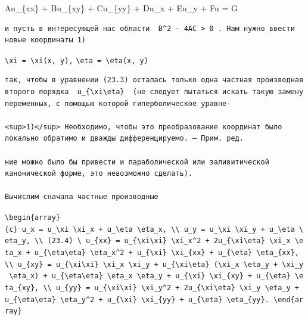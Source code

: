 \documentclass[
  ukrainian,
]{article}
\begin{document}
Au\_\{xx\} + Bu\_\{xy\} + Cu\_\{yy\} + Du\_x + Eu\_y + Fu = G

\begin{verbatim}
и пусть в интересующей нас области  B^2 - 4AC > 0 . Нам нужно ввести новые координаты 1)
\end{verbatim}

\texttt{\textbackslash{}xi\ =\ \textbackslash{}xi(x,\ y),}
\texttt{\textbackslash{}eta\ =\ \textbackslash{}eta(x,\ y)}

\begin{verbatim}
так, чтобы в уравнении (23.3) осталась только одна частная производная второго порядка  u_{\xi\eta}  (не следует пытаться искать такую замену переменных, с помощью которой гиперболическое уравне-

<sup>1)</sup> Необходимо, чтобы это преобразование координат было локально обратимо и дважды дифференцируемо. — Прим. ред.

ние можно было бы привести и параболической или заливитической канонической форме, это невозможно сделать).

Вычислим сначала частные производные
\end{verbatim}

\texttt{\textbackslash{}begin\{array\}\{c\}\ u\_x\ =\ u\_\textbackslash{}xi\ \textbackslash{}xi\_x\ +\ u\_\textbackslash{}eta\ \textbackslash{}eta\_x,\ \textbackslash{}\textbackslash{}\ u\_y\ =\ u\_\textbackslash{}xi\ \textbackslash{}xi\_y\ +\ u\_\textbackslash{}eta\ \textbackslash{}eta\_y,\ \textbackslash{}\textbackslash{}\ (23.4)\ \textbackslash{}\ u\_\{xx\}\ =\ u\_\{\textbackslash{}xi\textbackslash{}xi\}\ \textbackslash{}xi\_x\^{}2\ +\ 2u\_\{\textbackslash{}xi\textbackslash{}eta\}\ \textbackslash{}xi\_x\ \textbackslash{}eta\_x\ +\ u\_\{\textbackslash{}eta\textbackslash{}eta\}\ \textbackslash{}eta\_x\^{}2\ +\ u\_\{\textbackslash{}xi\}\ \textbackslash{}xi\_\{xx\}\ +\ u\_\{\textbackslash{}eta\}\ \textbackslash{}eta\_\{xx\},\ \textbackslash{}\textbackslash{}\ u\_\{xy\}\ =\ u\_\{\textbackslash{}xi\textbackslash{}xi\}\ \textbackslash{}xi\_x\ \textbackslash{}xi\_y\ +\ u\_\{\textbackslash{}xi\textbackslash{}eta\}\ (\textbackslash{}xi\_x\ \textbackslash{}eta\_y\ +\ \textbackslash{}xi\_y\ \textbackslash{}eta\_x)\ +\ u\_\{\textbackslash{}eta\textbackslash{}eta\}\ \textbackslash{}eta\_x\ \textbackslash{}eta\_y\ +\ u\_\{\textbackslash{}xi\}\ \textbackslash{}xi\_\{xy\}\ +\ u\_\{\textbackslash{}eta\}\ \textbackslash{}eta\_\{xy\},\ \textbackslash{}\textbackslash{}\ u\_\{yy\}\ =\ u\_\{\textbackslash{}xi\textbackslash{}xi\}\ \textbackslash{}xi\_y\^{}2\ +\ 2u\_\{\textbackslash{}xi\textbackslash{}eta\}\ \textbackslash{}xi\_y\ \textbackslash{}eta\_y\ +\ u\_\{\textbackslash{}eta\textbackslash{}eta\}\ \textbackslash{}eta\_y\^{}2\ +\ u\_\{\textbackslash{}xi\}\ \textbackslash{}xi\_\{yy\}\ +\ u\_\{\textbackslash{}eta\}\ \textbackslash{}eta\_\{yy\}.\ \textbackslash{}end\{array\}}
\end{document}
